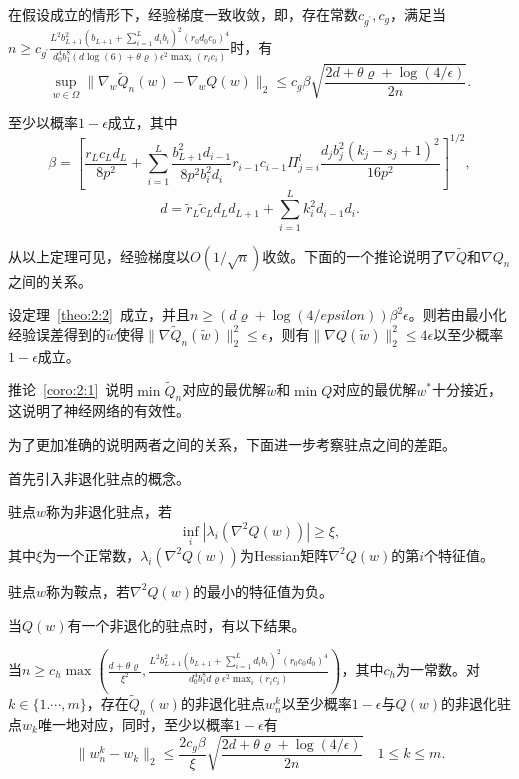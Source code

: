 \begin{theorem}\label{theo:2:2}
在假设成立的情形下，经验梯度一致收敛，即，存在常数$c_{g^\prime}, c_g$，满足当$n \geq c_{g^\prime}\frac{L^2 b_{L+1}^2(b_{L+1}+\sum_{i=1}^Ld_ib_i)^2(r_0d_0c_0)^4}{d_0^4b_1^8(d\log(6)+\theta\varrho)\epsilon^2\max_i(r_ic_i)}$时，有
\[
\sup_{w\in \Omega} \|\nabla_w \tilde{Q}_n(w)-\nabla_wQ(w)\|_2\leq c_g \beta \sqrt{\frac{2d+\theta\varrho+\log(4/\epsilon)}{2n}}.
\]
\par
至少以概率$1-\epsilon$成立，其中
\[
\beta = [\frac{r_Lc_Ld_L}{8p^2}+\sum_{i=1}^L\frac{b_{L+1}^2d_{i-1}}{8p^2b_i^2d_i}r_{i-1}c_{i-1}\Pi_{j=i}^l\frac{d_jb_j^2(k_j-s_j+1)^2}{16p^2}]^{1/2},
\]
\[
d = \tilde{r}_L\tilde{c}_L d_Ld_{L+1}+\sum_{i=1}^L k_i^2d_{i-1}d_i.
\]
\end{theorem}
\par
从以上定理可见，经验梯度以$O(1/\sqrt{n})$收敛。下面的一个推论说明了$\nabla \tilde{Q}$和$\nabla Q_n$之间的关系。
\begin{corollary}\label{coro:2:1}
设定理~\ref{theo:2:2}~成立，并且$n \geq (d\varrho +\log(4/epsilon))\beta^2\epsilon$。则若由最小化经验误差得到的$\tilde{w}$使得$\|\nabla \tilde{Q}_n(\tilde{w})\|_2^2 \leq \epsilon$，则有$\|\nabla Q(\tilde{w})\|_2^2 \leq 4\epsilon$以至少概率$1-\epsilon$成立。
\end{corollary}
\par
推论~\ref{coro:2:1}~说明$\min \tilde{Q}_n$对应的最优解$\tilde{w}$和$\min Q$对应的最优解$w^*$十分接近，这说明了神经网络的有效性。
\par
为了更加准确的说明两者之间的关系，下面进一步考察驻点之间的差距。
\par
首先引入非退化驻点的概念。
\begin{definition}
驻点$w$称为非退化驻点，若
\[
\inf_i |\lambda_i(\nabla^2 Q(w))| \geq \xi ,
\]
其中$\xi$为一个正常数，$\lambda_i(\nabla^2 Q(w))$为Hessian矩阵$\nabla^2 Q(w)$的第$i$个特征值。
\par
驻点$w$称为鞍点，若$\nabla^2 Q(w)$的最小的特征值为负。
\end{definition}
\par
当$Q(w)$有一个非退化的驻点时，有以下结果。
\begin{theorem}\label{theo:2:3}
当$n \geq c_h \max(\frac{d+\theta\varrho}{\xi^2},\frac{L^2b_{L+1}^2(b_{L+1}+\sum_{i=1}^Ld_ib_i)^2(r_0c_0d_0)^4}{d_0^4 b_1^8d\varrho \epsilon^2\max_i(r_ic_i)})$，其中$c_h$为一常数。对$k\in\{1.\cdots,m\}$，存在$\tilde{Q}_n(w)$的非退化驻点$w_n^k$以至少概率$1-\epsilon$与$Q(w)$的非退化驻点$w_k$唯一地对应，同时，至少以概率$1-\epsilon$有
\[
\|w_n^k - w_k\|_2 \leq \frac{2c_g \beta}{\xi}\sqrt{\frac{2d+\theta\varrho+\log(4/\epsilon)}{2n}}\quad 1\leq k \leq m.
\]

\end{theorem}

